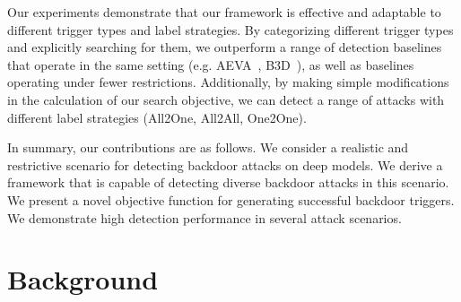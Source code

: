 \documentclass[letterpaper,twocolumn,10pt]{article}
\begin{document}
Our experiments demonstrate that our framework is effective and adaptable to different trigger types and label strategies. By categorizing different trigger types and explicitly searching for them, we outperform a range of detection baselines that operate in the same setting (e.g. AEVA~\cite{guo2021aeva}, B3D~\cite{dong2021black}), as well as baselines operating under fewer restrictions. Additionally, by making simple modifications in the calculation of our search objective, we can detect a range of attacks with different label strategies (All2One, All2All, One2One).

In summary, our contributions are as follows. We consider a realistic and restrictive scenario for detecting backdoor attacks on deep models. We derive a framework that is capable of detecting diverse backdoor attacks in this scenario.
We present a novel objective function for generating successful backdoor triggers.
We demonstrate high detection performance in several attack scenarios.

\section{Background}
\label{sec:prelims}
\end{document}
